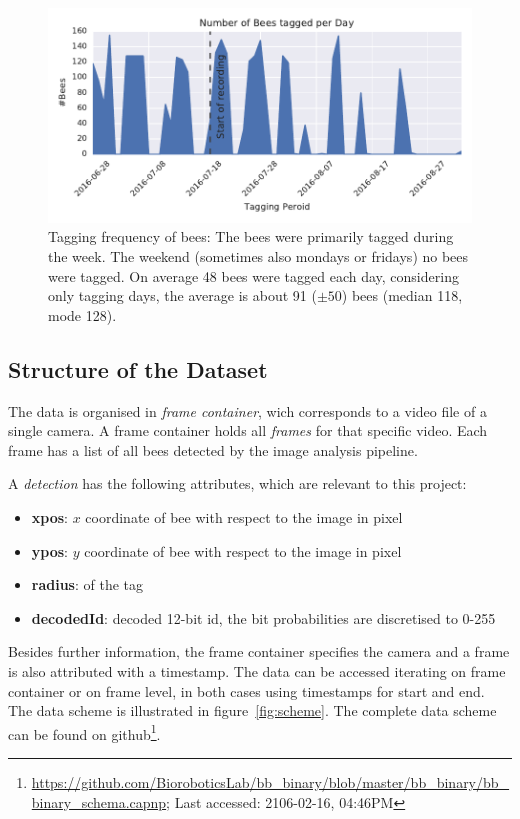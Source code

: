 \begin{figure}[htb]
	\centering
	\includegraphics[width=1.0\textwidth]{Figures/tagging_period}
	\caption[Tagging Frequency]{Tagging frequency of bees: The bees were primarily tagged during the week. The weekend (sometimes also mondays or fridays) no bees were tagged. On average 48 bees were tagged each day, considering only tagging days, the average is about 91 ($\pm50$) bees (median 118, mode 128).}
	\label{fig:tagging}
\end{figure}

\subsection{Structure of the Dataset}
The data is organised in \emph{frame container}, wich corresponds to a video file of a single camera. A frame container holds all \emph{frames} for that specific video.
Each frame has a list of all bees detected by the image analysis pipeline.

A \emph{detection} has the following attributes, which are relevant to this project:

\begin{itemize}
\item \textbf{xpos}: $x$ coordinate of bee with respect to the image in pixel
\item \textbf{ypos}: $y$ coordinate of bee with respect to the image in pixel
\item \textbf{radius}: of the tag
\item \textbf{decodedId}: decoded 12-bit id, the bit probabilities are discretised to 0-255
\end{itemize}

Besides further information, the frame container specifies the camera and a frame is also attributed with a timestamp. The data can be accessed iterating on frame container or on frame level, in both cases using timestamps for start and end. The data scheme is illustrated in figure~\ref{fig:scheme}.
The complete data scheme can be found on github\footnote{\url{https://github.com/BioroboticsLab/bb_binary/blob/master/bb_binary/bb_binary_schema.capnp}; Last accessed: 2106-02-16, 04:46PM}. 



